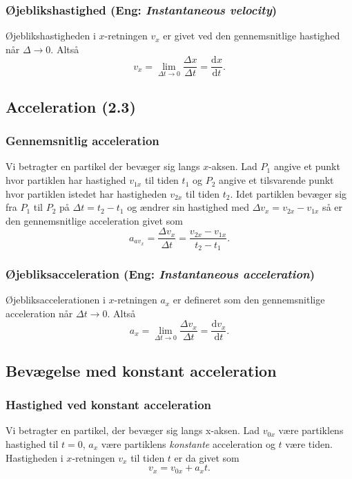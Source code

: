 \subsubsection{Øjeblikshastighed (Eng: \textit{Instantaneous velocity})} \label{afs:inshas} 
Øjeblikshastigheden i $x$-retningen $v_x$ er givet ved den gennemsnitlige hastighed når $\Delta \to 0$. Altså
\[ 
v_x = \lim_{\Delta t \to 0} \frac{\Delta x}{\Delta t} = \frac{\mathrm{d}x}{\mathrm{d}t}
.\]

\subsection{Acceleration (2.3)}

\subsubsection{Gennemsnitlig acceleration} \label{afs:gnsacc}
Vi betragter en partikel der bevæger sig langs $x$-aksen. Lad $P_1$ angive et punkt hvor partiklen har hastighed $v_{1x}$ til tiden $t_1$ og $P_2$ angive et tilsvarende punkt hvor partiklen istedet har hastigheden $v_{2x}$ til tiden $t_2$. Idet partiklen bevæger sig fra $P_1$ til $P_2$ på $\Delta t = t_2 - t_1$ og ændrer sin hastighed med $\Delta v_x = v_{2x} - v_{1x}$ så er den gennemsnitlige acceleration givet som
\[ 
a_{av_x} = \frac{\Delta v_x}{\Delta t} = \frac{v_{2x} - v_{1x}}{t_2 - t_1}
.\]

\subsubsection{Øjebliksacceleration (Eng: \textit{Instantaneous acceleration})} \label{afs:insacc}
Øjebliksaccelerationen i $x$-retningen $a_x$ er defineret som den gennemsnitlige acceleration når $\Delta t \to 0$. Altså
\[ 
a_x = \lim_{\Delta t \to 0} \frac{\Delta v_x}{\Delta t} = \frac{\mathrm{d}v_x}{\mathrm{d}t}
.\]


\subsection{Bevægelse med konstant acceleration}

\subsubsection{Hastighed ved konstant acceleration} \label{afs:velconacc}
Vi betragter en partikel, der bevæger sig langs x-aksen. Lad $v_{0x}$ være partiklens hastighed til $t = 0$, $a_x$ være partiklens \textit{konstante} acceleration og $t$ være tiden. Hastigheden i $x$-retningen $v_x$ til tiden $t$ er da givet som
\[ 
v_x = v_{0x} + a_xt
.\]

